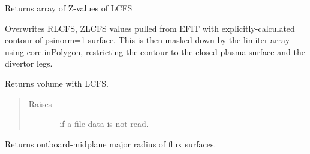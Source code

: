 \documentclass[letterpaper,10pt,english]{sphinxmanual}
\begin{document}
\begin{fulllineitems}

\begin{fulllineitems}
\label{eqtools:eqtools.eqdskreader.EqdskReader.getZLCFS}
Returns array of Z-values of LCFS

\end{fulllineitems}


\begin{fulllineitems}
\label{eqtools:eqtools.eqdskreader.EqdskReader.remapLCFS}
Overwrites RLCFS, ZLCFS values pulled from EFIT with explicitly-calculated contour
of psinorm=1 surface.  This is then masked down by the limiter array using core.inPolygon,
restricting the contour to the closed plasma surface and the divertor legs.

\end{fulllineitems}


\begin{fulllineitems}
\label{eqtools:eqtools.eqdskreader.EqdskReader.getFluxVol}
\end{fulllineitems}


\begin{fulllineitems}
\label{eqtools:eqtools.eqdskreader.EqdskReader.getVolLCFS}
Returns volume with LCFS.
\begin{quote}\begin{description}
\item[{Raises }] \leavevmode
{} -- 
if a-file data is not read.

\end{description}\end{quote}

\end{fulllineitems}


\begin{fulllineitems}
\label{eqtools:eqtools.eqdskreader.EqdskReader.getRmidPsi}
Returns outboard-midplane major radius of flux surfaces.


\end{fulllineitems}
\end{fulllineitems}
\end{document}
